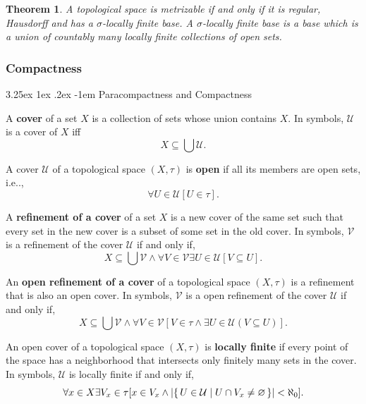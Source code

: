 \documentclass[12pt, letterpaper]{article}
\makeatletter
\newcommand\ie{i.e\@ifnextchar.{}{.\@}}
\newcommand{\card}[1]{\left\lvert #1 \right\rvert}
\renewcommand{\emptyset}{\varnothing}
\newtheorem{thm}[prop]{Theorem}
\renewcommand\paragraph{\@startsection{paragraph}{4}{\z@}%
	{3.25ex \@plus1ex \@minus.2ex}%
	{-1em}%
	{\normalfont\normalsize\bfseries}}
\theoremstyle{definition}
\theoremstyle{remark}
\theoremstyle{definition}
\theoremstyle{plain}
\numberwithin{equation}{section}
\makeatother
\begin{document}
	\begin{thm}
		A topological space is metrizable if and only if it is regular, Hausdorff and has a $\sigma$-locally finite base. A $\sigma$-locally finite base is a base which is a union of countably many locally finite collections of open sets.
	\end{thm}

	\subsubsection{Compactness}
	\paragraph{Paracompactness and Compactness}
	\begin{def*}[cover]
		A \textbf{cover} of a set $X$ is a collection of sets whose union contains $X$. In symbols, $\mathcal{U}$ is a cover of $X$ iff
		\[X \subseteq \bigcup \mathcal{U}.\]
	\end{def*}

	\begin{def*}
		A cover $\mathcal{U}$ of a topological space $(X,\tau)$ is \textbf{open} if all its members are open sets, \ie,
		\[\forall U\in\mathcal{U} [U\in\tau]. \]
	\end{def*}

	\begin{def*}
		A \textbf{refinement of a cover} of a set $X$ is a new cover of the same set
		such that every set in the new cover is a subset of some set in the old cover.
		In symbols, $\mathcal{V}$ is a refinement of the cover $\mathcal{U}$ if and only if,
		\[ X\subseteq\bigcup\mathcal{V} \land \forall V\in\mathcal{V} \exists U\in \mathcal{U}[V\subseteq U]. \]
	\end{def*}

	\begin{def*}
		An \textbf{open refinement of a cover} of a topological space $(X,\tau)$ is a refinement that is also an open cover.
		In symbols, $\mathcal{V}$ is a open refinement of the cover $\mathcal{U}$ if and only if,
		\[ X\subseteq\bigcup\mathcal{V} \land \forall V\in\mathcal{V} [V\in\tau\land\exists U\in \mathcal{U}(V\subseteq U)]. \]
	\end{def*}

	\begin{def*}
		An open cover of a topological space $(X,\tau)$ is \textbf{locally finite}
		if every point of the space has a neighborhood that intersects only finitely many sets in the cover.
		In symbols, $\mathcal{U}$ is locally finite if and only if,
		\[ \forall x\in X \exists V_x\in \tau [x\in V_x\land \card{\set{U\in\mathcal{U} | U\cap V_x\ne\emptyset}}<\aleph_0 ] .\]
	\end{def*}
\end{document}
